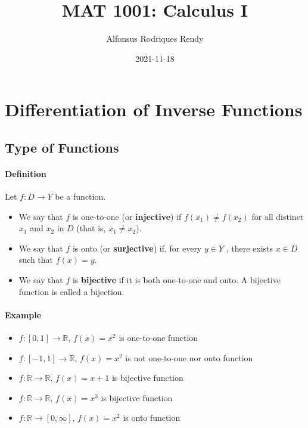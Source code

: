 \documentclass[12pt]{article}
\title{MAT 1001: Calculus I}
\author{Alfonsus Rodriques Rendy}
\date{2021-11-18}
\begin{document}
\begin{center}
    \hspace*{-0.5cm}
\end{center}

\section{Differentiation of Inverse Functions}
\subsection{Type of Functions}
\paragraph{Definition} Let $f : D \rightarrow Y$ be a function.
\begin{itemize} 
    \item We say that $f$ is one-to-one (or \textbf{injective}) if $f(x_1) \neq f(x_2)$ for
    all distinct $x_1$ and $x_2$ in $D$ (that is, $x_1 \neq x_2$).
    \item We say that $f$ is onto (or \textbf{surjective}) if, for every $y \in Y$ , there
    exists $x \in D$ such that $f(x) = y$.
    \item We say that $f$ is \textbf{bijective} if it is both one-to-one and onto. A
    bijective function is called a bijection.
\end{itemize}

\paragraph{Example}
\begin{itemize} 
     \item $f : [0, 1] \to \mathbb{R}$, $f(x) = x^2$ is one-to-one function
     \item $f : [-1, 1] \to \mathbb{R}$, $f(x) = x^2$ is not one-to-one nor onto function
     \item $f : \mathbb{R} \to \mathbb{R}$, $f(x) = x + 1$ is bijective function
     \item $f : \mathbb{R} \to \mathbb{R}$, $f(x) = x^3$ is bijective function
     \item $f : \mathbb{R} \to [0, \infty]$, $f(x) = x^2$ is onto function
\end{itemize}
\end{document}
